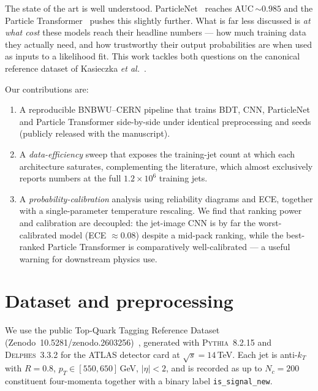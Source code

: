 \documentclass[11pt,a4paper]{article}
\begin{document}
The state of the art is well understood.  ParticleNet~\cite{particlenet}
reaches AUC\,$\sim\!0.985$ and the Particle Transformer~\cite{partformer}
pushes this slightly further.  What is far less discussed is
\emph{at what cost} these models reach their headline numbers ---
how much training data they actually need, and how trustworthy their
output probabilities are when used as inputs to a likelihood fit.
This work tackles both questions on the canonical reference dataset
of Kasieczka \emph{et al.}~\cite{topref}.

Our contributions are:
\begin{enumerate}
    \item A reproducible BNBWU--CERN pipeline that trains BDT, CNN,
          ParticleNet and Particle Transformer side-by-side under
          identical preprocessing and seeds (publicly released with
          the manuscript).
    \item A \emph{data-efficiency} sweep that exposes the
          training-jet count at which each architecture saturates,
          complementing the literature, which almost exclusively
          reports numbers at the full $1.2\!\times\!10^6$ training
          jets.
    \item A \emph{probability-calibration} analysis using reliability
          diagrams and ECE, together with a single-parameter
          temperature rescaling.  We find that ranking power and
          calibration are decoupled: the jet-image CNN is by far the
          worst-calibrated model (ECE $\approx0.08$) despite a
          mid-pack ranking, while the best-ranked Particle Transformer
          is comparatively well-calibrated --- a useful warning for
          downstream physics use.
\end{enumerate}

\section{Dataset and preprocessing}\label{sec:data}

We use the public Top-Quark Tagging Reference Dataset
(Zenodo~10.5281/zenodo.2603256)~\cite{topref}, generated with
\textsc{Pythia}~8.2.15 and \textsc{Delphes}~3.3.2 for the ATLAS
detector card at $\sqrt{s}=14$\,TeV.  Each jet is anti-$k_T$ with
$R\!=\!0.8$, $p_T\in[550,650]$\,GeV, $|\eta|<2$, and is recorded as
up to $N_c\!=\!200$ constituent four-momenta together with a binary
label \texttt{is\_signal\_new}.
\end{document}

